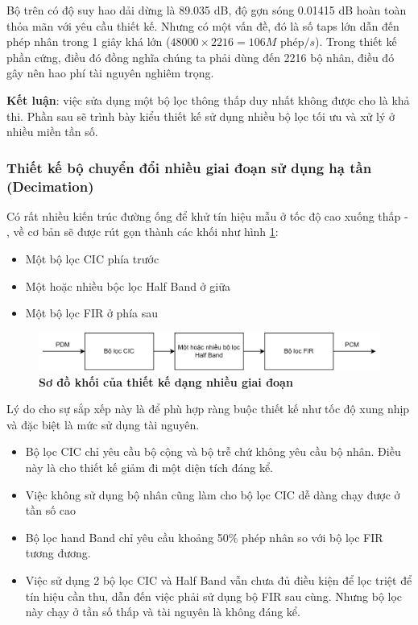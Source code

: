 Bộ trên có độ suy hao dải dừng là 89.035 dB, độ gợn sóng 0.01415 dB hoàn toàn thỏa mãn với yêu cầu thiết kế. Nhưng có một vấn đề, đó là số taps lớn dẫn đến phép nhân trong 1 giây khá lớn ($48000 \times 2216 = 106M \text{ phép}/s$). Trong thiết kế phần cứng, điều đó đồng nghĩa chúng ta phải dùng đến 2216 bộ nhân, điều đó gây nên hao phí tài nguyên nghiêm trọng.

\textbf{Kết luận}: việc sửa dụng một bộ lọc thông thấp duy nhất không được cho là khả thi. Phần sau sẽ trình bày kiểu thiết kế sử dụng nhiều bộ lọc tối ưu và xử lý ở nhiều miền tần số.

\subsubsection{Thiết kế bộ chuyển đổi nhiều giai đoạn sử dụng hạ tần (Decimation)}
Có rất nhiều kiến trúc đường ống để khử tín hiệu mẫu ở tốc độ cao xuống thấp \cite{pipelie1} - \cite{pipelie2}, về cơ bản sẽ được rút gọn thành các khối như hình \ref{pipeline_top}:
\begin{itemize}
    \item Một bộ lọc CIC phía trước
    \item Một hoặc nhiều bộc lọc Half Band ở giữa
    \item Một bộ lọc FIR ở phía sau
\end{itemize}

\begin{figure}[H]
    \centering
    \includegraphics[width=15cm]{Images/Chuong3/pipeline_top.png}
    \caption[Sơ đồ khối của thiết kế dạng nhiều giai đoạn]{\bfseries \fontsize{12pt}{0pt}\selectfont Sơ đồ khối của thiết kế dạng nhiều giai đoạn}
    \label{pipeline_top}
\end{figure}
Lý do cho sự sắp xếp này là để phù hợp ràng buộc thiết kế như tốc độ xung nhịp và đặc biệt là mức sử dụng tài nguyên.
\begin{itemize}
    \item Bộ lọc CIC chỉ yêu cầu bộ cộng và bộ trễ chứ không yêu cầu bộ nhân. Điều này là cho thiết kế giảm đi một diện tích đáng kể.
    \item Việc không sử dụng bộ nhân cũng làm cho bộ lọc CIC dễ dàng chạy được ở tần số cao
    \item Bộ lọc hand Band chỉ yêu cầu khoảng 50\% phép nhân so với bộ lọc FIR tương đương.
    \item Việc sử dụng 2 bộ lọc CIC và Half Band vẫn chưa đủ điều kiện để lọc triệt để tín hiệu cần thu, dẫn đến việc phải sử dụng bộ FIR sau cùng. Nhưng bộ lọc này chạy ở tần số thấp và tài nguyên là không đáng kể.
\end{itemize}
